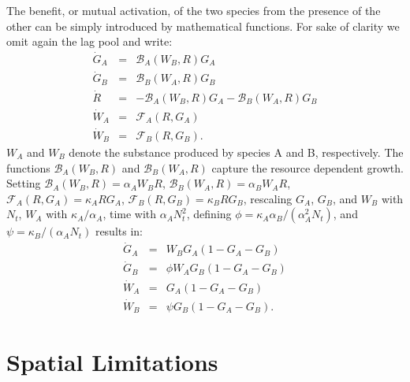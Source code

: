 \documentclass[10pt,A4paper]{article}
\begin{document}
The benefit, or mutual activation, of the two species from the presence of the other can be simply introduced by mathematical functions. 
For sake of clarity we omit again the lag pool and write:
\begin{eqnarray}
\dot{G}_A &=& \mathcal{B}_A(W_B,R)G_A\\
\dot{G}_B &=& \mathcal{B}_B(W_A,R)G_B\\
\dot{R} &=&-\mathcal{B}_A(W_B,R)G_A-\mathcal{B}_B(W_A,R)G_B\\
\dot{W}_A &=& \mathcal{F}_A(R,G_A)\\
\dot{W}_B &=& \mathcal{F}_B(R,G_B).
\end{eqnarray}
$W_A$ and $W_B$ denote the substance produced by species A and B, respectively. 
The functions $\mathcal{B}_A(W_B,R)$ and $\mathcal{B}_B(W_A,R)$ capture the resource dependent growth. 
Setting $\mathcal{B}_A(W_B,R)=\alpha_A W_BR$, $\mathcal{B}_B(W_A,R)=\alpha_B W_AR$, $\mathcal{F}_A(R,G_A)=\kappa_A RG_A$, $\mathcal{F}_B(R,G_B)=\kappa_B RG_B$, rescaling $G_A$, $G_B$, and $W_B$ with $N_t$, $W_A$ with $\kappa_A/\alpha_A$, time with $\alpha_AN_t^2$, defining $\phi=\kappa_A\alpha_B/(\alpha_A^2N_t)$, and $\psi=\kappa_B/(\alpha_A N_t)$ results in: 
\begin{eqnarray}
\dot{G}_A &=& W_BG_A\left(1 - G_A-G_B\right )\\
\dot{G}_B &=& \phi W_AG_B\left(1 - G_A-G_B\right )\\
\dot{W}_A &=& G_A\left(1 - G_A-G_B\right )\\
\dot{W}_B &=&\psi G_B\left(1 - G_A-G_B\right ).
\end{eqnarray}

\section{Spatial Limitations}




\end{document}
